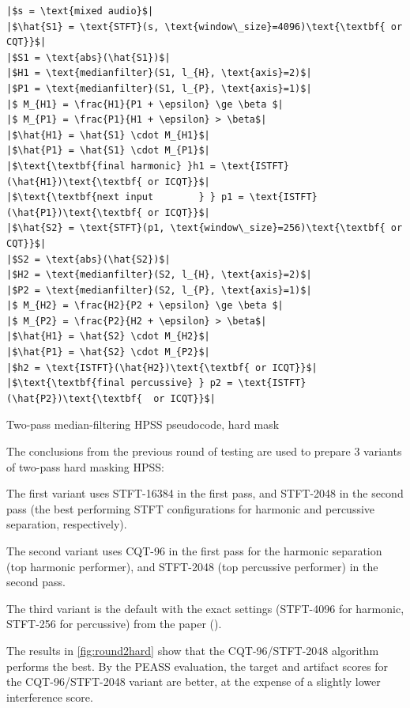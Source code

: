 \documentclass[10pt,letter]{article}
\newlength{\mintednumbersep}
\newenvironment{tight_enumerate}{
\begin{enumerate}
\setlength{\itemsep}{0pt}
\setlength{\parskip}{0pt}
}{\end{enumerate}}
\begin{document}
\begin{listing}[h]
\setlength\partopsep{-\topsep}
\begin{verbatim}
|$s = \text{mixed audio}$|
|$\hat{S1} = \text{STFT}(s, \text{window\_size}=4096)\text{\textbf{ or CQT}}$|
|$S1 = \text{abs}(\hat{S1})$|
|$H1 = \text{medianfilter}(S1, l_{H}, \text{axis}=2)$|
|$P1 = \text{medianfilter}(S1, l_{P}, \text{axis}=1)$|
|$ M_{H1} = \frac{H1}{P1 + \epsilon} \ge \beta $|
|$ M_{P1} = \frac{P1}{H1 + \epsilon} > \beta$|
|$\hat{H1} = \hat{S1} \cdot M_{H1}$|
|$\hat{P1} = \hat{S1} \cdot M_{P1}$|
|$\text{\textbf{final harmonic} }h1 = \text{ISTFT}(\hat{H1})\text{\textbf{ or ICQT}}$|
|$\text{\textbf{next input        } } p1 = \text{ISTFT}(\hat{P1})\text{\textbf{ or ICQT}}$|
|$\hat{S2} = \text{STFT}(p1, \text{window\_size}=256)\text{\textbf{ or CQT}}$|
|$S2 = \text{abs}(\hat{S2})$|
|$H2 = \text{medianfilter}(S2, l_{H}, \text{axis}=2)$|
|$P2 = \text{medianfilter}(S2, l_{P}, \text{axis}=1)$|
|$ M_{H2} = \frac{H2}{P2 + \epsilon} \ge \beta $|
|$ M_{P2} = \frac{P2}{H2 + \epsilon} > \beta$|
|$\hat{H1} = \hat{S2} \cdot M_{H2}$|
|$\hat{P1} = \hat{S2} \cdot M_{P2}$|
|$h2 = \text{ISTFT}(\hat{H2})\text{\textbf{ or ICQT}}$|
|$\text{\textbf{final percussive} } p2 = \text{ISTFT}(\hat{P2})\text{\textbf{  or ICQT}}$|
\end{verbatim}
\caption{Two-pass median-filtering HPSS pseudocode, hard mask}
\label{code:twopassdriedgerpseudo}
\end{listing}

The conclusions from the previous round of testing are used to prepare 3 variants of two-pass hard masking HPSS:
\begin{tight_enumerate}
	\vspace{-0.5em}
	\item
		The first variant uses STFT-16384 in the first pass, and STFT-2048 in the second pass (the best performing STFT configurations for harmonic and percussive separation, respectively).
	\item
		The second variant uses CQT-96 in the first pass for the harmonic separation (top harmonic performer), and STFT-2048 (top percussive performer) in the second pass.
	\item
		The third variant is the default with the exact settings (STFT-4096 for harmonic, STFT-256 for percussive) from the paper (\cite{driedger}).
\end{tight_enumerate}

The results in \ref{fig:round2hard} show that the CQT-96/STFT-2048 algorithm performs the best. By the PEASS evaluation, the target and artifact scores for the CQT-96/STFT-2048 variant are better, at the expense of a slightly lower interference score.
\end{document}
